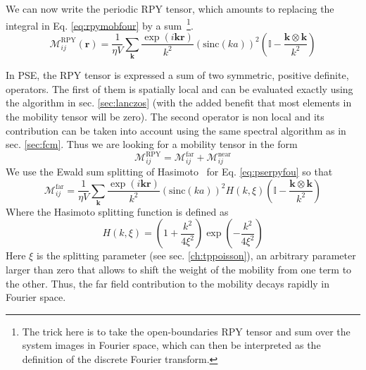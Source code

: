 \documentclass[twoside,openright,titlepage,numbers=noenddot,%
headinclude,footinclude,cleardoublepage=empty,abstract=on,
BCOR=5mm,fontsize=11pt, dvipsnames, paper=b5
]{scrreprt}
\renewcommand{\vec}[1]{\bm{#1}}
\newcommand{\tens}[1]{\bm{\mathcal{#1}}}
\newcommand{\sinc}{\textrm{sinc}}
\newcommand{\near}{\textrm{near}}
\newcommand{\far}{\textrm{far}}
\begin{document}
We can now write the periodic \gls{RPY} tensor, which amounts to replacing the integral in Eq. \eqref{eq:rpymobfour} by a sum~\cite{Fiore2017}\footnote{The trick here is to take the open-boundaries \gls{RPY} tensor and sum over the system images in Fourier space, which can then be interpreted as the definition of the discrete Fourier transform.}.
\begin{equation}
  \label{eq:pserpyfou}
  \tens{M}_{ij}^{\textrm{RPY}}(\vec{r})= \frac{1}{\eta V} \sum_{\vec{k}} \frac{\exp(i\vec{k}\vec{r})}{k^2}\left(\sinc(ka) \right)^2\left(\mathbb{I} - \frac{\vec{k}\otimes\vec{k}}{k^2}\right)
\end{equation}

In \gls{PSE}, the \gls{RPY} tensor is expressed a sum of two symmetric, positive definite, operators. The first of them is spatially local and can be evaluated exactly using the algorithm in sec. \ref{sec:lanczos} (with the added benefit that most elements in the mobility tensor will be zero). The second operator is non local and its contribution can be taken into account using the same spectral algorithm as in sec. \ref{sec:fcm}.
Thus we are looking for a mobility tensor in the form
\begin{equation}
  \label{eq:psemobsep}
  \tens{M}_{ij}^{\textrm{RPY}} = \tens{M}_{ij}^{\far} + \tens{M}^{ \near}_{ij}
\end{equation}
We use the Ewald sum splitting of Hasimoto~\cite{Hasimoto1959} for Eq. \eqref{eq:pserpyfou} so that
\begin{equation}
  \label{eq:pserpyfar}
  \tens{M}_{ij}^{\far}= \frac{1}{\eta V} \sum_{\vec{k}} \frac{\exp(i\vec{k}\vec{r})}{k^2}\left(\sinc(ka) \right)^2H(k,\xi)\left(\mathbb{I} - \frac{\vec{k}\otimes\vec{k}}{k^2}\right)
\end{equation}
Where the Hasimoto splitting function is defined as
\begin{equation}
  \label{eq:psehasimoto}
  H(k,\xi) = \left(1 + \frac{k^2}{4\xi^2}\right)\exp\left(-\frac{k^2}{4\xi^2}\right)
\end{equation}
Here $\xi$ is the splitting parameter (see sec. \ref{ch:tppoisson}), an arbitrary parameter larger than zero that allows to shift the weight of the mobility from one term to the other. Thus, the far field contribution to the mobility decays rapidly in Fourier space.
\end{document}
